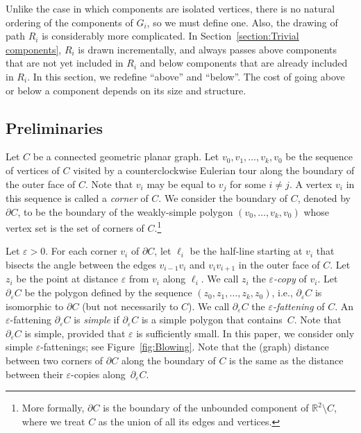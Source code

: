 \documentclass{patmorin}
\begin{document}
Unlike the case in which
components are isolated vertices, there is no natural ordering of the
components of $G_i$, so we must define one. Also, the drawing
of path $R_i$ is considerably more complicated.  In Section~\ref{section:Trivial components}, $R_i$ is drawn incrementally, and always passes above components that are not yet included in $R_i$ and below components that are already included in $R_i$.  In this section, we redefine ``above'' and ``below''. The cost of going above or below a component depends on its size and structure.


\subsection{Preliminaries}\label{section:Preliminaries}
Let $C$ be a connected geometric planar graph. Let $v_0, v_1, \ldots, v_k, v_0$ be the sequence of vertices of $C$ visited by a counterclockwise
Eulerian tour along the boundary of the outer face of $C$. Note that
$v_i$ may be equal to $v_j$ for some $i\neq j$.  A vertex $v_i$
in this sequence is called a \emph{corner} of $C$.  We consider the boundary of $C$, denoted by $\partial C$, to be the
boundary of the weakly-simple polygon $(v_0, \ldots, v_k, v_0)$ whose
vertex set is the set of corners of $C$.\footnote{More formally, $\partial C$ is the boundary of the unbounded component of $\mathbb{R}^2\setminus C$, where we treat $C$ as the union of all its edges and vertices.}

Let $\varepsilon >0$. For each corner $v_i$ of $\partial C$, let $\ell_i$ be the half-line starting at $v_i$ that bisects the angle between the edges $v_{i-1}v_i$ and $v_i v_{i+1}$ in the outer face of $C$. Let $z_i$ be the point at distance $\varepsilon$ from $v_i$ along $\ell_i$. We call $z_i$ the \emph{$\varepsilon$-copy} of $v_i$. Let $\partial_\varepsilon C$ be the polygon defined by the sequence $(z_0, z_1, \ldots, z_k, z_0)$, i.e., $\partial_\varepsilon C$ is isomorphic to $\partial C$ (but not necessarily to $C$). We call $\partial_\varepsilon C$ the \emph{$\varepsilon$-fattening} of $C$.
An $\varepsilon$-fattening $\partial_\varepsilon C$ is \emph{simple} if $\partial_\varepsilon C$  is a simple polygon that contains~$C$.
Note that $\partial_\varepsilon C$ is simple, provided that $\varepsilon$ is sufficiently small. In this paper, we consider only simple $\varepsilon$-fattenings; see Figure~\ref{fig:Blowing}. Note that the (graph) distance between two corners of $\partial C$ along the boundary of $C$ is the same as the distance between their $\varepsilon$-copies along~$\partial_\varepsilon C$.
\end{document}
